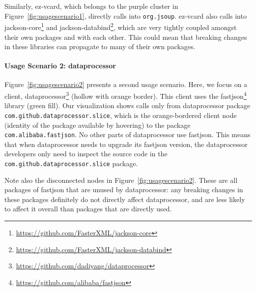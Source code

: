 Similarly, ez-vcard, which belongs to the purple cluster in Figure~\ref{fig:usagescenario1}, directly calls into \texttt{org.jsoup}. ez-vcard also calls into jackson-core\footnote{\url{https://github.com/FasterXML/jackson-core}\label{jackson-core}} and jackson-databind\footnote{\url{https://github.com/FasterXML/jackson-databind}\label{jackson-databind}}, which are very tightly coupled amongst their own packages and with each other. This could mean that breaking changes in these libraries can propagate to many of their own packages.

\paragraph{Usage Scenario 2: dataprocessor}

Figure~\ref{fig:usagescenario2} presents a second usage scenario. Here, we focus on a client, dataprocessor\footnote{\url{https://github.com/dadiyang/dataprocessor}\label{dataprocessor}} (hollow with orange border). This client uses the fastjson\footnote{\url{https://github.com/alibaba/fastjson}\label{fastjson}} library (green fill). Our visualization shows calls only from dataprocessor package \texttt{com.github.dataprocessor.slice}, which is the orange-bordered client node (identity of the package available by hovering) to the package \texttt{com.alibaba.fastjson}. No other parts of dataprocessor use fastjson. This means that when dataprocessor needs to upgrade its fastjson version, the dataprocessor developers only need to inspect the source code in the \texttt{com.github.dataprocessor.slice} package. 

Note also the disconnected nodes in Figure~\ref{fig:usagescenario2}. These are all packages of fastjson that are unused by dataprocessor: any breaking changes in these packages definitely do not directly affect dataprocessor, and are less likely to affect it overall than packages that are directly used.
